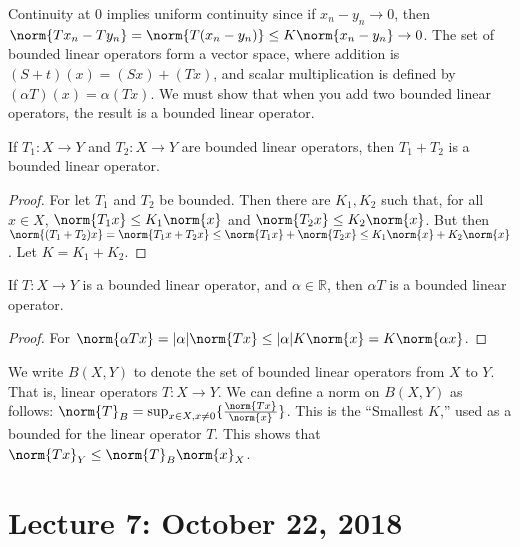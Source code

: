         Continuity at 0 implies uniform continuity since
        if $x_{n}-y_{n}\rightarrow{0}$, then
        $\norm{Tx_{n}-Ty_{n}}=\norm{T(x_{n}-y_{n})}%
         \leq{K}\norm{x_{n}-y_{n}}\rightarrow{0}$.
        The set of bounded linear operators form a vector space,
        where addition is $(S+t)(x)=(Sx)+(Tx)$, and scalar multiplication
        is defined by $(\alpha{T})(x)=\alpha(Tx)$. We must show that
        when you add two bounded linear operators, the result is a
        bounded linear operator.
        \begin{theorem}
            If $T_{1}:X\rightarrow{Y}$ and $T_{2}:X\rightarrow{Y}$
            are bounded linear operators, then $T_{1}+T_{2}$ is a
            bounded linear operator.
        \end{theorem}
        \begin{proof}
            For let $T_{1}$ and $T_{2}$ be bounded. Then there are
            $K_{1},K_{2}$ such that, for all $x\in{X}$,
            $\norm{T_{1}x}\leq{K_{1}}\norm{x}$ and
            $\norm{T_{2}x}\leq{K_{2}}\norm{x}$. But then
            $\norm{(T_{1}+T_{2})x}=\norm{T_{1}x+T_{2}x}%
             \leq\norm{T_{1}x}+\norm{T_{2}x}%
             \leq{K_{1}}\norm{x}+K_{2}\norm{x}$. Let $K=K_{1}+K_{2}$.
        \end{proof}
        \begin{theorem}
            If $T:X\rightarrow{Y}$ is a bounded linear operator, and
            $\alpha\in\mathbb{R}$, then $\alpha{T}$ is a bounded
            linear operator.
        \end{theorem}
        \begin{proof}
            For
            $\norm{\alpha{Tx}}=|\alpha|\norm{Tx}%
             \leq|\alpha|K\norm{x}=K\norm{\alpha{x}}$.
        \end{proof}
        We write $B(X,Y)$ to denote the set of bounded linear
        operators from $X$ to $Y$. That is, linear operators
        $T:X\rightarrow{Y}$.
        We can define a norm on $B(X,Y)$ as follows:
        $\norm{T}_{B}%
         =\sup_{x\in{X},x\ne{0}}\{\frac{\norm{Tx}}{\norm{x}}\}$.
        This is the ``Smallest $K$,'' used as a bounded for the linear
        operator $T$. This shows that
        $\norm{Tx}_{Y}\leq\norm{T}_{B}\norm{x}_{X}$.
    \section{Lecture 7: October 22, 2018}
